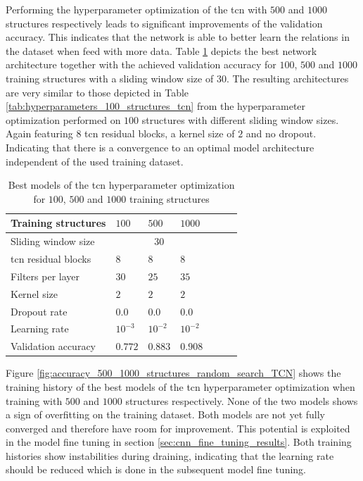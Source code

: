 \documentclass[conference]{IEEEtran}
\begin{document}
Performing the hyperparameter optimization of the \gls{tcn} with $ 500 $ and $ 1000 $ structures respectively leads to significant improvements of the validation accuracy. This indicates that the network is able to better learn the relations in the dataset when feed with more data. Table \ref{tab:hyperparameters_100_500_1000_structures_TCN} depicts the best network architecture together with the achieved validation accuracy for $ 100 $, $ 500 $ and $ 1000 $ training structures with a sliding window size of $ 30 $. The resulting architectures are very similar to those depicted in Table \ref{tab:hyperparameters_100_structures_tcn} from the hyperparameter optimization performed on $ 100 $ structures with different sliding window sizes. Again featuring $ 8 $ \gls{tcn} residual blocks, a kernel size of $ 2 $ and no dropout. Indicating that there is a convergence to an optimal model architecture independent of the used training dataset.

\begin{table}[htp]
	\centering
	\caption{Best models of the \gls{tcn} hyperparameter optimization for $ 100 $, $ 500 $ and $ 1000 $ training structures}
	\label{tab:hyperparameters_100_500_1000_structures_TCN}
	\begin{tabular}{l|llllll}
		Training structures & $ 100 $ & $ 500 $ & $ 1000 $ \\
		\hline
		Sliding window size & \multicolumn{3}{c}{$ 30 $} \\
		\hline
		\gls{tcn} residual blocks & $ 8 $ & $ 8 $ & $ 8 $ \\
		Filters per layer & $ 30 $ & $ 25 $ & $ 35 $ \\
		Kernel size & $ 2 $ & $ 2 $ & $ 2 $ \\
		Dropout rate & $ 0.0 $ & $ 0.0 $ & $ 0.0 $ \\
		Learning rate & $ 10^{-3} $ & $ 10^{-2} $ & $ 10^{-2} $ \\
		\hline
		Validation accuracy & $ 0.772 $ & $ 0.883 $ & $ 0.908 $
	\end{tabular}
\end{table}

Figure \ref{fig:accuracy_500_1000_structures_random_search_TCN} shows the training history of the best models of the \gls{tcn} hyperparameter optimization when training with $ 500 $ and $ 1000 $ structures respectively. None of the two models shows a sign of overfitting on the training dataset. Both models are not yet fully converged and therefore have room for improvement. This potential is exploited in the model fine tuning in section \ref{sec:cnn_fine_tuning_results}. Both training histories show instabilities during draining, indicating that the learning rate should be reduced which is done in the subsequent model fine tuning.
\end{document}
